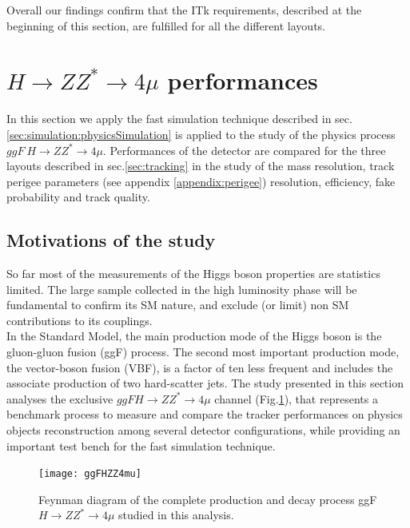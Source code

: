 \documentclass[a4paper,twoside,12pt]{article}
\begin{document}
Overall our findings confirm that the ITk requirements, described at the beginning of this section, are fulfilled for all the different layouts.

\clearpage

\section{$H \rightarrow ZZ^* \rightarrow 4\mu$ performances}
In this section we apply the fast simulation technique described in sec.\ref{sec:simulation:physicsSimulation} is
applied to the study of the physics process $ggF\ H \rightarrow ZZ^* \rightarrow 4\mu$. Performances of the detector are compared for the three layouts described in sec.\ref{sec:tracking} 
in the study of the mass resolution, track perigee parameters (see appendix \ref{appendix:perigee}) resolution, efficiency, fake probability
and track quality.\\

\subsection{Motivations of the study}
So far most of the measurements of the Higgs boson properties are statistics limited. The large sample collected in the high luminosity phase will be
fundamental to confirm its SM nature, and exclude (or limit) non SM contributions to its couplings. \\

In the Standard Model, the main 
production mode of the Higgs boson is the gluon-gluon fusion (ggF) process. The second most 
important production mode, the vector-boson fusion (VBF), is a factor of ten less frequent and includes the associate
production of two hard-scatter jets. The study presented in this section analyses the exclusive
$ggF H \rightarrow ZZ^* \rightarrow 4\mu$ channel (Fig.\ref{fig:ggFHZZ4mu}), that represents a benchmark process to measure and compare the tracker performances on physics objects reconstruction among several detector
configurations, while providing an important test bench for the fast simulation technique.\\

\begin{figure} [h]
	\centering
	\texttt{[image: ggFHZZ4mu]}
	\caption{Feynman diagram of the complete production and decay process 
	ggF $H \rightarrow ZZ^* \rightarrow 4\mu$ studied in 
	this analysis.}
	\label{fig:ggFHZZ4mu}
\end{figure}
\end{document}
